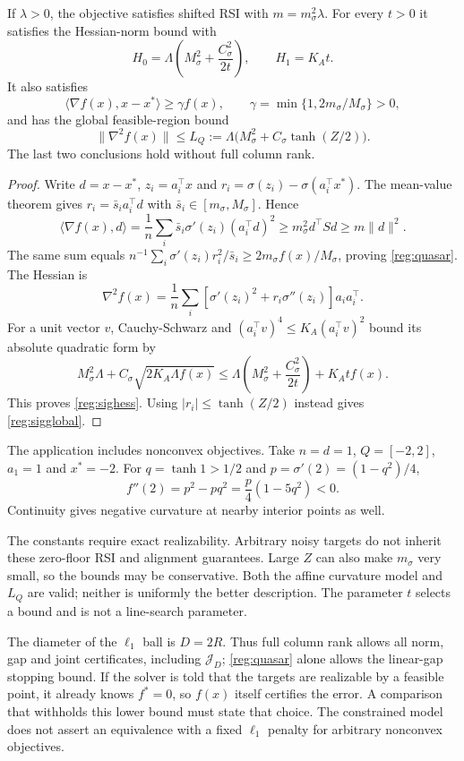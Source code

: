 \begin{proposition}
\label{reg:sigmoidbounds}
If $\lambda>0$, the objective satisfies shifted RSI with
$m=m_\sigma^2\lambda$. For every $t>0$ it satisfies the Hessian-norm
bound with
\begin{equation}\label{reg:sighess}
 H_0=\Lambda\left(M_\sigma^2+\frac{C_\sigma^2}{2t}\right),
 \qquad H_1=K_A t.
\end{equation}
It also satisfies
\begin{equation}\label{reg:quasar}
 \langle\nabla f(x),x-x^*\rangle\ge\gamma f(x),\qquad
 \gamma=\min\{1,2m_\sigma/M_\sigma\}>0,
\end{equation}
and has the global feasible-region bound
\begin{equation}\label{reg:sigglobal}
 \|\nabla^2f(x)\|\le L_Q
 :=\Lambda\bigl(M_\sigma^2+C_\sigma\tanh(Z/2)\bigr).
\end{equation}
The last two conclusions hold without full column rank.
\end{proposition}
\begin{proof}
Write $d=x-x^*$, $z_i=a_i^\top x$ and
$r_i=\sigma(z_i)-\sigma(a_i^\top x^*)$.
The mean-value theorem gives $r_i=\bar s_i a_i^\top d$ with
$\bar s_i\in[m_\sigma,M_\sigma]$. Hence
\[
 \langle\nabla f(x),d\rangle
 =\frac1n\sum_i\bar s_i\sigma'(z_i)(a_i^\top d)^2
 \ge m_\sigma^2d^\top Sd\ge m\|d\|^2.
\]
The same sum equals
$n^{-1}\sum_i\sigma'(z_i)r_i^2/\bar s_i
 \ge 2m_\sigma f(x)/M_\sigma$, proving \eqref{reg:quasar}.
The Hessian is
\[
 \nabla^2f(x)=\frac1n\sum_i
 [\sigma'(z_i)^2+r_i\sigma''(z_i)]a_i a_i^\top.
\]
For a unit vector $v$, Cauchy-Schwarz and
$(a_i^\top v)^4\le K_A(a_i^\top v)^2$ bound its absolute quadratic
form by
\[
 M_\sigma^2\Lambda+C_\sigma\sqrt{2K_A\Lambda f(x)}
 \le\Lambda\left(M_\sigma^2+\frac{C_\sigma^2}{2t}\right)+K_Atf(x).
\]
This proves \eqref{reg:sighess}. Using
$|r_i|\le\tanh(Z/2)$ instead gives \eqref{reg:sigglobal}.
\end{proof}

The application includes nonconvex objectives. Take $n=d=1$,
$Q=[-2,2]$, $a_1=1$ and $x^*=-2$. For
$q=\tanh1>1/2$ and $p=\sigma'(2)=(1-q^2)/4$,
\[
 f''(2)=p^2-pq^2=\frac p4(1-5q^2)<0.
\]
Continuity gives negative curvature at nearby interior points as well.

The constants require exact realizability. Arbitrary noisy targets
do not inherit these zero-floor RSI and alignment guarantees.
Large $Z$ can also make $m_\sigma$ very small, so the bounds may be
conservative. Both the affine curvature model and $L_Q$ are valid;
neither is uniformly the better description. The parameter $t$ selects
a bound and is not a line-search parameter.

The diameter of the $\ell_1$ ball is $D=2R$. Thus full column rank
allows all norm, gap and joint certificates, including $\mathcal J_D$;
\eqref{reg:quasar} alone allows the linear-gap stopping bound.
If the solver is told that the targets are realizable by a feasible
point, it already knows $f^*=0$, so $f(x)$ itself certifies the error.
A comparison that withholds this lower bound must state that choice.
The constrained model does not assert an equivalence with a fixed
$\ell_1$ penalty for arbitrary nonconvex objectives.
